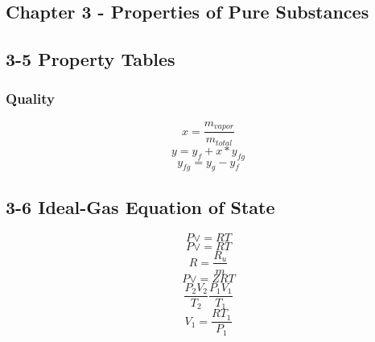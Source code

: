 \documentclass[10pt,landscape]{article}
\begin{document}
\begin{multicols}{3}
\section{Chapter 3 - Properties of Pure Substances}
\subsection{3-5 Property Tables}
\subsubsection{Quality}
\begin{equation}
    x=\frac{m_{vapor}}{m_{total}}
\end{equation}
\begin{equation}
    y=y_f+x*y_{fg}
\end{equation}
\begin{equation}
    y_{fg}=y_g-y_f
\end{equation}
\subsection{3-6 Ideal-Gas Equation of State}
\begin{equation}
    P\vee=RT
\end{equation}
\begin{equation}
    P\vee=RT
\end{equation}
\begin{equation}
    R=\frac{R_u}{m}
\end{equation}
\begin{equation}
    P\vee=ZRT
\end{equation}
\begin{equation}
    \frac{P_2V_2}{T_2}\frac{P_1V_1}{T_1}
\end{equation}
\begin{equation}
    V_1=\frac{RT_1}{P_1}
\end{equation}


\end{multicols}
\end{document}
